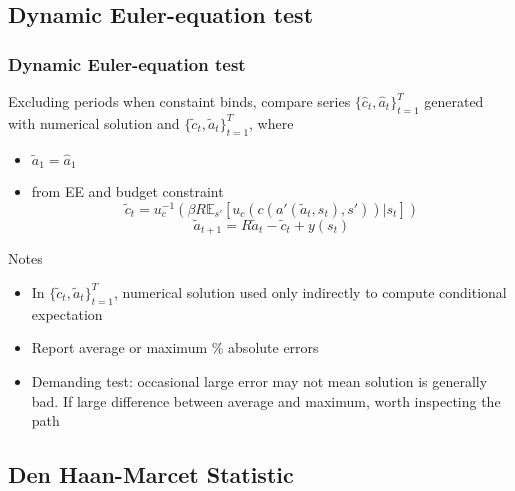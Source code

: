 \documentclass{beamer}
\begin{document}
\subsection{Dynamic Euler-equation test}

\begin{frame}
  \frametitle{Dynamic Euler-equation test}
  Excluding periods when constaint binds, compare series $\{\hat{c}_t,\hat{a}_t\}_{t=1}^T$ generated with numerical solution and $\{\tilde{c}_t,\tilde{a}_t\}_{t=1}^T$, where
  \begin{itemize}
    \item $\tilde{a}_1 = \hat{a}_1$
    \item from EE and budget constraint
  \begin{equation*}
    \tilde{c}_t = u_c^{-1}\left(\beta R \mathbb{E}_{s'}[u_c(c(a'(\tilde{a}_t,s_t),s'))|s_t]\right)
  \end{equation*}
  \begin{equation*}
    \tilde{a}_{t+1}= R\tilde{a}_t - \tilde{c}_t + y(s_t)
  \end{equation*}
  \end{itemize}

  \begin{block}{Notes}
    \begin{itemize}
      \item In $\{\tilde{c}_t,\tilde{a}_t\}_{t=1}^T$, numerical solution used only indirectly to compute conditional expectation
      \item Report average or maximum \% absolute errors
      \item Demanding test: occasional large error may not mean solution is generally bad. If large difference between average and maximum, worth inspecting the path
  \end{itemize}
  \end{block}
\end{frame}

\subsection{Den Haan-Marcet Statistic}
\end{document}
